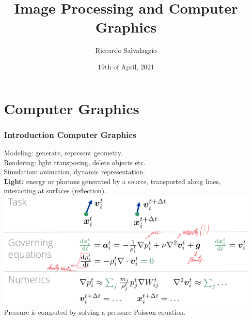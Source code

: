 \documentclass{article}
\title{Image Processing and Computer Graphics}
\author{Riccardo Salvalaggio}
\date{19th of April, 2021}
\begin{document}
\maketitle
\newpage
\tableofcontents
\newpage

\part{Computer Graphics}
\newpage
\section{Introduction Computer Graphics}
Modeling: generate, represent geometry.\\
Rendering: light transposing, delete objects etc.\\
Simulation: animation, dynamic representation.\\

\textbf{Light:} energy or photons generated by a source, transported along lines, interacting at surfaces (reflection).\\
\includegraphics{image1.png}
Pressure is computed by solving a pressure Poisson equation.
\end{document}
